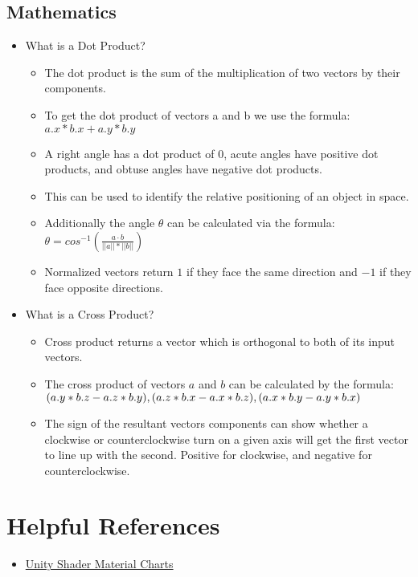 \documentclass{article}
\begin{document}
\subsection{Mathematics}
\begin{itemize}
    \item What is a Dot Product?
    \begin{itemize}
        \item The dot product is the sum of the multiplication of two vectors by their components.
        \item To get the dot product of vectors a and b we use the formula: $a.x*b.x + a.y*b.y$
        \item A right angle has a dot product of $0$, acute angles have positive dot products, and obtuse angles have negative dot products.
        \item This can be used to identify the relative positioning of an object in space.
        \item Additionally the angle $\theta$ can be calculated via the formula: $\theta = cos^{-1}(\frac{a \cdot b}{||a||*||b||})$
        \item Normalized vectors return $1$ if they face the same direction and $-1$ if they face opposite directions.
    \end{itemize}
    \item What is a Cross Product?
    \begin{itemize}
        \item Cross product returns a vector which is orthogonal to both of its input vectors.
        \item The cross product of vectors $a$ and $b$ can be calculated by the formula:
        $\newline (a.y*b.z - a.z*b.y), (a.z*b.x - a.x*b.z), (a.x*b.y - a.y*b.x)$
        \item The sign of the resultant vectors components can show whether a clockwise or counterclockwise turn on a given axis will get the first vector to line up with the second. Positive for clockwise, and negative for counterclockwise.
    \end{itemize}
\end{itemize}

\newpage
\section{Helpful References}
\begin{itemize}
    \item \href{https://docs.unity3d.com/Manual/StandardShaderMaterialCharts.html}{Unity Shader Material Charts}
\end{itemize}
\end{document}
